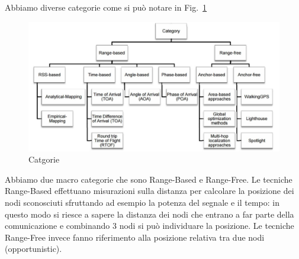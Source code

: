 Abbiamo diverse categorie come si può notare in
Fig.~\ref{fig:fig3-lec3pt1}
\begin{figure}
        \centering
        \includegraphics[scale=0.6]{fig3-lec3pt1.png}
        \caption{Catgorie}
        \label{fig:fig3-lec3pt1}
\end{figure}
Abbiamo due macro categorie che sono Range-Based e Range-Free.
Le tecniche Range-Based effettuano misurazioni sulla distanza per
calcolare la posizione dei nodi sconosciuti sfruttando ad esempio la potenza del
segnale e il tempo: in questo modo si riesce a sapere la distanza dei nodi che
entrano a far parte della comunicazione e combinando 3 nodi si può individuare
la posizione. Le tecniche Range-Free invece fanno riferimento alla posizione
relativa tra due nodi (opportunistic).

